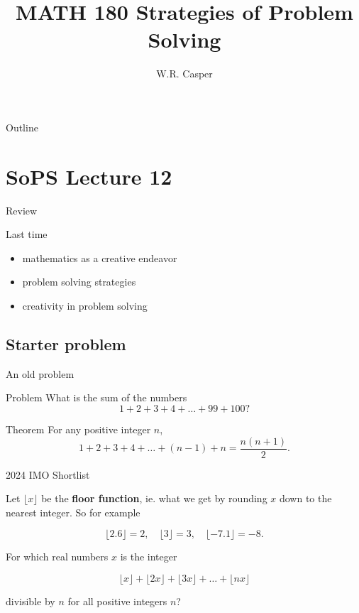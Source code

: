 \documentclass{beamer}
\title{MATH 180 Strategies of Problem Solving}
\subtitle
{} %
\author[W.R. Casper] %
{W.R. Casper}
\institute[California State University Fullerton] %
{
  Department of Mathematics\\
  California State University Fullerton}
\begin{document}
\begin{frame}
  \titlepage
\end{frame}

\begin{frame}{Outline}
  \tableofcontents
\end{frame}



\section{SoPS Lecture 12}

\begin{frame}{Review}
  \begin{block}{Last time}
    \begin{itemize}
\pause
      \item mathematics as a creative endeavor
      \item problem solving strategies
      \item creativity in problem solving
    \end{itemize}
  \end{block}
\end{frame}

\subsection{Starter problem}

\begin{frame}{An old problem}
  \begin{block}{Problem}
    What is the sum of the numbers
    $$1 + 2 + 3 + 4 + \dots + 99 + 100?$$
  \end{block}
\pause
  \begin{block}{Theorem}
    For any positive integer $n$,
    $$1 + 2 + 3 + 4 + \dots + (n-1) + n = \frac{n(n+1)}{2}.$$
  \end{block}
\end{frame}

\begin{frame}{2024 IMO Shortlist}

Let $\lfloor x\rfloor$ be the \textbf{floor function}, ie. what we get by rounding $x$ down to the nearest integer.  So for example

$$\lfloor 2.6\rfloor = 2,\quad \lfloor 3\rfloor  = 3,\quad \lfloor -7.1\rfloor = -8.$$

\pause
For which real numbers $x$ is the integer 

$$\lfloor x \rfloor + \lfloor 2x \rfloor + \lfloor 3x\rfloor + \dots + \lfloor nx\rfloor$$

divisible by $n$ for all positive integers $n$?
\end{frame}
\end{document}
